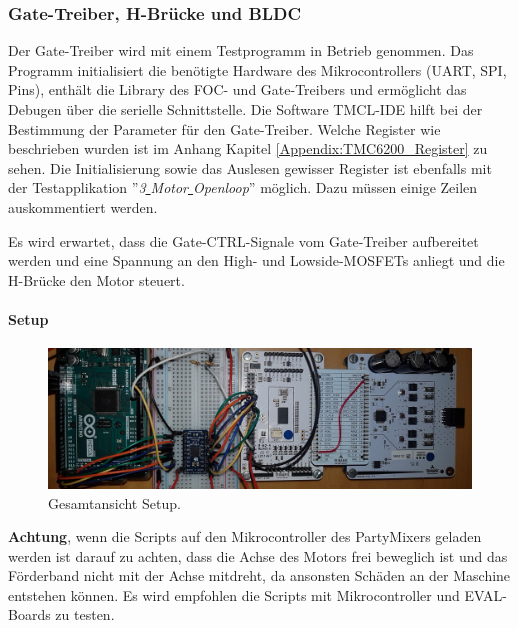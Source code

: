 \subsubsection{Gate-Treiber, H-Brücke und BLDC}
\label{subsubsec:Inbetriebnahme_Gate_Treiber}

Der Gate-Treiber wird mit einem Testprogramm in Betrieb genommen. Das Programm initialisiert die benötigte Hardware des Mikrocontrollers (UART, SPI, Pins), enthält die Library des FOC- und Gate-Treibers und ermöglicht das Debugen über die serielle Schnittstelle. Die Software TMCL-IDE hilft bei der Bestimmung der Parameter für den Gate-Treiber. Welche Register wie beschrieben wurden ist im Anhang Kapitel \ref{Appendix:TMC6200_Register} zu sehen. Die Initialisierung sowie das Auslesen gewisser Register ist ebenfalls mit der Testapplikation ''\textit{3\underline{ }Motor\underline{ }Openloop}'' möglich. Dazu müssen einige Zeilen auskommentiert werden.

Es wird erwartet, dass die Gate-CTRL-Signale vom Gate-Treiber aufbereitet werden und eine Spannung an den High- und Lowside-MOSFETs anliegt und die H-Brücke den Motor steuert.

\paragraph{Setup}\mbox{}

\begin{figure}[H]
	\centering
	\includegraphics[angle=270,width=\textwidth]{graphics/2_komplett1}
	\caption{Gesamtansicht Setup.}
	\label{fig:2_komplett1}
\end{figure}

\textbf{Achtung}, wenn die Scripts auf den Mikrocontroller des PartyMixers geladen werden ist darauf zu achten, dass die Achse des Motors frei beweglich ist und das Förderband nicht mit der Achse mitdreht, da ansonsten Schäden an der Maschine entstehen können. Es wird empfohlen die Scripts mit Mikrocontroller und EVAL-Boards zu testen.

